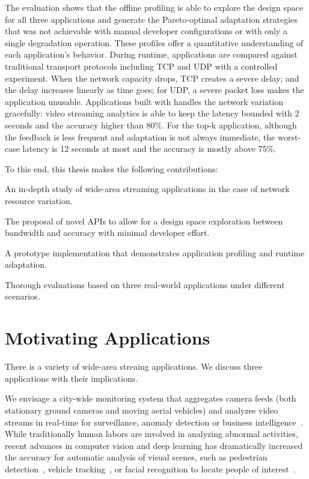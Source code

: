 The evaluation shows that the offline profiling is able to explore the design
space for all three applications and generate the Pareto-optimal adaptation
strategies that was not achievable with manual developer configurations or with
only a single degradation operation. These profiles offer a quantitative
understanding of each application's behavior. During runtime, \sysname{}
applications are compared against traditional transport protocols including TCP
and UDP with a controlled experiment. When the network capacity drops, TCP
creates a severe delay; and the delay increases linearly as time goes; for UDP,
a severe packet loss makes the application unusable. Applications built with
\sysname{} handles the network variation gracefully: video streaming analytics
is able to keep the latency bounded with 2 seconds and the accuracy higher than
80\%. For the top-k application, although the feedback is less frequent and
adaptation is not always immediate, the worst-case latency is 12 seconds at most
and the accuracy is mostly above 75\%.

To this end, this thesis makes the following contributions:

\squishlist    %
\item An in-depth study of wide-area streaming applications in the case of
  network resource variation.
\item The proposal of novel APIs to allow for a design space exploration between
  bandwidth and accuracy with minimal developer effort.
\item A prototype implementation that demonstrates application profiling and
  runtime adaptation.
\item Thorough evaluations based on three real-world applications under
  different scenarios.
\squishend %

\section{Motivating Applications}
\label{sec:motiv-appl}

There is a variety of wide-area streaing applications. We discuss three
applications with their implications.

 We envisage a city-wide monitoring system that
aggregates camera feeds (both stationary ground cameras and moving aerial
vehicles) and analyzes video streams in real-time for surveillance, anomaly
detection or business intelligence~\cite{oh2011large}. While traditionally human
labors are involved in analyzing abnormal activities, recent advances in
computer vision and deep learning has dramatically increased the accuracy for
automatic analysis of visual scenes, such as pedestrian
detection~\cite{dollar2012pedestrian}, vehicle tracking~\cite{coifman1998real},
or facial recognition to locate people of
interest~\cite{Lu:2015:SHF:2888116.2888245, parkhi2015deep}.

